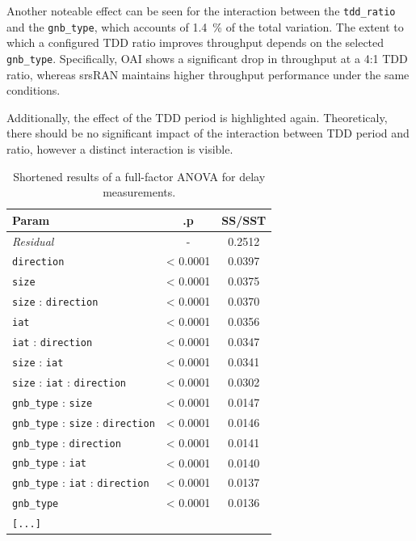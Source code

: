 Another noteable effect can be seen for the interaction between the \texttt{tdd\_ratio} and the \texttt{gnb\_type},
which accounts of \SI{1.4}{\percent} of the total variation.
The extent to which a configured \gls{TDD} ratio improves throughput depends on the selected \texttt{gnb\_type}.
Specifically, OAI shows a significant drop in throughput at a 4:1 \gls{TDD} ratio, whereas srsRAN maintains higher throughput performance under the same conditions.

Additionally, the effect of the \gls{TDD} period is highlighted again.
Theoreticaly, there should be no significant impact of the interaction between \gls{TDD} period and ratio, however a distinct interaction is visible.





\begin{table}[htb]
\centering
\caption{Shortened results of a full-factor ANOVA for delay measurements.}
\label{tab:eval:anova.scapy.delay}
\begin{tabular}{l | c | c }

    \toprule
Param                                     & .p        & SS/SST \\
    \midrule
\textit{Residual}                                                     & {-}       & 0.2512 \\
\texttt{direction}                                                    & < 0.0001    & 0.0397 \\
\texttt{size}                                                         & < 0.0001    & 0.0375 \\
\texttt{size} : \texttt{direction}                                    & < 0.0001    & 0.0370 \\
\texttt{iat}                                                          & < 0.0001    & 0.0356 \\
\texttt{iat} : \texttt{direction}                                     & < 0.0001    & 0.0347 \\
\texttt{size} : \texttt{iat}                                          & < 0.0001    & 0.0341 \\
\texttt{size} : \texttt{iat} : \texttt{direction}                     & < 0.0001    & 0.0302 \\
\texttt{gnb\_type} : \texttt{size}                                     & < 0.0001    & 0.0147 \\
\texttt{gnb\_type} : \texttt{size} : \texttt{direction}                & < 0.0001    & 0.0146 \\
\texttt{gnb\_type} : \texttt{direction}                                & < 0.0001    & 0.0141 \\
\texttt{gnb\_type} : \texttt{iat}                                      & < 0.0001    & 0.0140 \\
\texttt{gnb\_type} : \texttt{iat} : \texttt{direction}                 & < 0.0001    & 0.0137 \\
\texttt{gnb\_type}                                                     & < 0.0001    & 0.0136 \\
\texttt{[...]} & & \\


\end{tabular}
\end{table}
